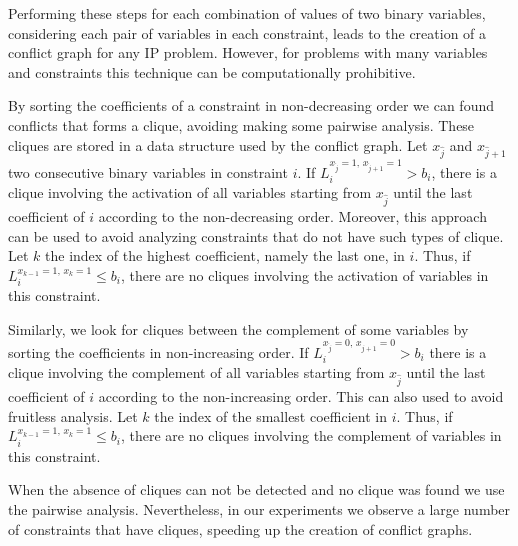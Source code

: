 \documentclass{endm}
\begin{document}
Performing these steps for each combination of values ​​of two binary variables, considering each pair of variables in each constraint, leads to the creation of a conflict graph for any IP problem. However, for problems with many variables and constraints this technique can be computationally prohibitive.

By sorting the coefficients of a constraint in non-decreasing order we can found conflicts that forms a clique, avoiding making some pairwise analysis. These cliques are stored in a data structure used by the conflict graph. Let $x_{\hat{j}}$ and $x_{\hat{j}+1}$ two consecutive binary variables in constraint $i$. If $L_{i}^{x_{\hat{j}}=1,\, x_{\hat{j}+1}=1}>b_{i}$, there is a clique involving the activation of all variables starting from $x_{\hat{j}}$ until the last coefficient of $i$ according to the non-decreasing order. Moreover, this approach can be used to avoid analyzing constraints that do not have such types of clique. Let $k$ the index of the highest coefficient, namely the last one, in $i$. Thus, if $L_{i}^{x_{k-1}=1,\, x_{k}=1}\leq b_{i}$, there are no cliques involving the activation of variables in this constraint.

Similarly, we look for cliques between the complement of some variables by sorting the coefficients in non-increasing order. If $L_{i}^{x_{\hat{j}} = 0,\, x_{\hat{j}+1} = 0} > b_i$ there is a clique involving the complement of all variables starting from $x_{\hat{j}}$ until the last coefficient of $i$ according to the non-increasing order. This can also used to avoid fruitless analysis. Let $k$ the index of the smallest coefficient in $i$. Thus, if $L_{i}^{x_{k-1}=1,\, x_{k}=1}\leq b_{i}$, there are no cliques involving the complement of variables in this constraint.

When the absence of cliques can not be detected and no clique was found we use the pairwise analysis. Nevertheless, in our experiments we observe a large number of constraints that have cliques, speeding up the creation of conflict graphs.

\begin{example}


\end{example}
\end{document}
